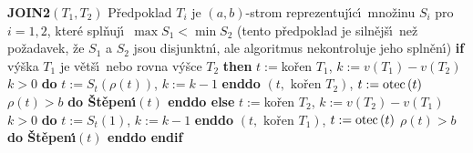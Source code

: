 {\bf JOIN2$\left(T_1,T_2\right)$}\newline
P\v redpoklad $T_i$ je $\left(a,b\right)$-strom reprezentuj\'\i c\'\i\ 
mno\v zinu $S_i$ pro $i=1,2$, kter\'e spl\v nuj\'\i\ $\max S_1<\min 
S_2$ 
(tento p\v redpoklad je siln\v ej\v s\'\i\ ne\v z po\v zadavek, \v ze $
S_1$ a 
$S_2$ jsou disjunktn\'\i , ale algoritmus nekontroluje jeho spln\v en\'\i )\newline 
{\bf if} v\'y\v ska $T_1$ je v\v et\v s\'\i\ nebo rovna v\'y\v sce $T_2$ {\bf then}\newline 
\phantom{---}$t:=$ko\v ren $T_1$, $k:=v\left(T_1\right)-v\left(T_2\right)$\newline 
\phantom{---}{\bf while} $k>0$ {\bf do} $t:=S_t\left(\rho \left(t\right)\right)$, $k:=k-1$ {\bf enddo}\newline 
\phantom{---}{\bf Spojen\'\i}$\left(t,\text{ ko\v ren }T_2\right)$, $t:=\operatorname{otec}\left(t\right)$\newline 
\phantom{---}{\bf while} $\rho \left(t\right)>b$ {\bf do \v St\v epen\'\i$\left(t\right)$ enddo\newline 
else}\newline 
\phantom{---}$t:=$ko\v ren $T_2$, $k:=v\left(T_2\right)-v\left(T_1\right)$ \newline 
\phantom{---}{\bf while} $k>0$ {\bf do} $t:=S_t\left(1\right)$, $k:=k-1$ {\bf enddo}\newline 
\phantom{---}{\bf Spojen\'\i}$\left(t,\text{ ko\v ren }T_1\right)$, $t:=\operatorname{otec}\left(t\right)$\newline 
\phantom{---}{\bf while} $\rho \left(t\right)>b$ {\bf do \v St\v epen\'\i$\left(t\right)$ enddo\newline 
endif}
\medskip

